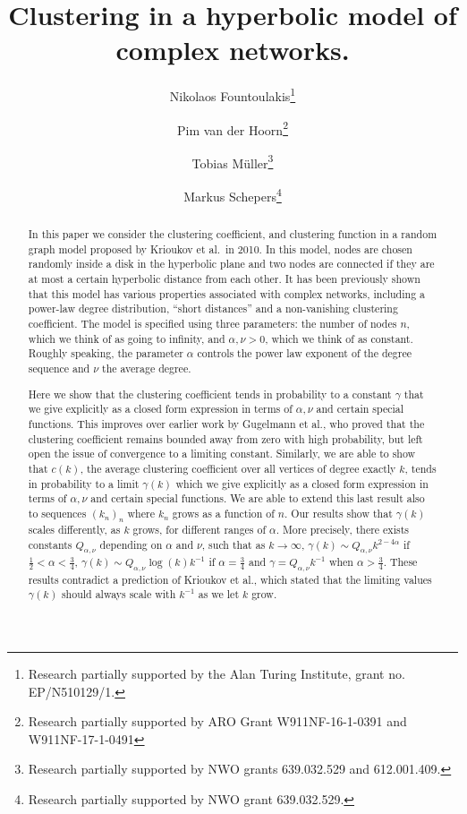 \documentclass[a4paper,10pt]{article}
\title{Clustering in a hyperbolic model of complex networks.}
\author[1]{Nikolaos Fountoulakis\thanks{Research partially supported by the Alan Turing Institute, grant no. EP/N510129/1.}}
\author[2]{Pim van der Hoorn\thanks{Research partially supported by ARO Grant W911NF-16-1-0391 and W911NF-17-1-0491}}
\author[3]{Tobias M\"{u}ller\thanks{Research partially supported by NWO grants 639.032.529 and 612.001.409.}}
\author[3]{Markus Schepers\thanks{Research partially supported by NWO grant 639.032.529.}}
\affil[1]{ School of Mathematics, University of Birmingham, United Kingdom.}
\affil[2]{Department of Physics, Northeastern University, United States.}
\affil[3]{Bernoulli Institute, University of Groningen, The Netherlands.}
\newcommand{\1}{\mathds{1}}								%
\begin{document}
\maketitle

\begin{abstract}
In this paper we consider the clustering coefficient, and clustering function in a random graph model proposed by Krioukov et al.~in 2010. In this model, nodes are chosen randomly inside a disk in the hyperbolic plane and two nodes are connected if they are at most a certain hyperbolic distance from each other. It has been previously shown that this model has various properties associated with complex networks, including a power-law degree distribution, ``short distances'' and a non-vanishing clustering coefficient. The model is specified using three parameters: the number of nodes $n$, which we think of as going to infinity, and $\alpha, \nu > 0$, which we think of as constant. Roughly speaking, the parameter $\alpha$ controls the power law exponent of the degree sequence and $\nu$ the average degree.

Here we show that the clustering coefficient tends in probability to a constant $\gamma$ that we give explicitly as a closed form expression in terms of $\alpha, \nu$ and certain special functions. This improves over earlier work by Gugelmann et al., who proved that the clustering coefficient remains bounded away from zero with high probability, but left open the issue of convergence to a limiting constant. Similarly, we are able to show that $c(k)$, the average clustering coefficient over all vertices of degree exactly $k$, tends in probability to a limit $\gamma(k)$ which we give explicitly as a closed form expression in terms of $\alpha, \nu$ and certain special functions. We are able to extend this last result also to sequences $(k_n)_n$ where $k_n$ grows as a function of $n$. Our results show that $\gamma(k)$ scales differently, as $k$ grows, for different ranges of $\alpha$. More precisely, there exists constants $Q_{\alpha,\nu}$ depending on $\alpha$ and $\nu$, such that as $k \to \infty$, $\gamma(k) \sim Q_{\alpha,\nu} k^{2 - 4\alpha}$ if $\frac{1}{2} < \alpha < \frac{3}{4}$, $\gamma(k) \sim Q_{\alpha,\nu} \log(k) k^{-1} $ if $\alpha=\frac{3}{4}$ and $\gamma = Q_{\alpha,\nu} k^{-1}$ when $\alpha > \frac{3}{4}$. These results contradict a prediction of Krioukov et al., which stated that the limiting values $\gamma(k)$ should always scale with $k^{-1}$ as we let $k$ grow. 
\end{abstract}
\end{document}
